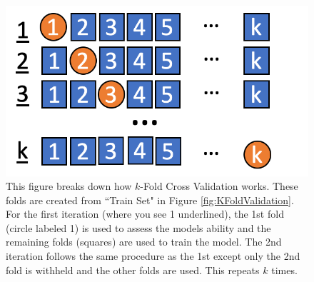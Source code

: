 \begin{figure}[!htb]
    \centering
      \centering
      \includegraphics[width=\textwidth]{figures/ppt/KFoldValidationExplain.png}
     
    
    \caption{
	This figure breaks down how \(k\)-Fold Cross Validation works. These folds are created from ``Train Set" in Figure \ref{fig:KFoldValidation}. For the first iteration (where you see 1 underlined), the 1st fold (circle labeled 1) is used to assess the models ability and the remaining folds (squares) are used to train the model. The 2nd iteration follows the same procedure as the 1st except only the 2nd fold is withheld and the other folds are used. This repeats \(k\) times.
      }
\label{fig:KFoldValidationExplain}
  \end{figure}




\clearpage

